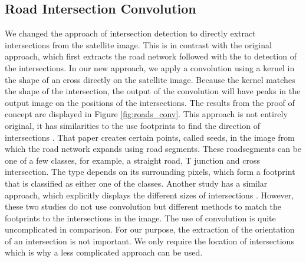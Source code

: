 \subsection{Road Intersection Convolution}
We changed the approach of intersection detection to directly extract intersections from the satellite image. This is in contrast with the original approach, which first extracts the road network followed with the to detection of the intersections. In our new approach, we apply a convolution using a kernel in the shape of an cross directly on the satellite image. Because the kernel matches the shape of the intersection, the output of the convolution will have peaks in the output image on the positions of the intersections. The results from the proof of concept are displayed in Figure \ref{fig:roads_conv}. This approach is not entirely original, it has similarities to the use footprints to find the direction of intersections \cite{hu2007road}. That paper creates certain points, called seeds, in the image from which the road network expands using road segments. These roadsegments can be one of a few classes, for example, a straight road, T junction and cross intersection. The type depends on its surrounding pixels, which form a footprint that is classified as either one of the classes. Another study has a similar approach, which explicitly displays the different sizes of intersections \cite{koutaki2004automatic}. However, these two studies do not use convolution but different methods to match the footprints to the intersections in the image. The use of convolution is quite uncomplicated in comparison. For our purpose, the extraction of the orientation of an intersection is not important. We only require the location of intersections which is why a less complicated approach can be used.

